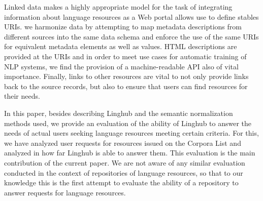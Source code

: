 \documentclass[smallextended]{svjour3}       %
\begin{document}
Linked data makes a highly appropriate model for the task of integrating information
about language resources as a Web portal allows use to define stables URIs.
we harmonize data by attempting to map metadata descriptions from different
sources into the same data schema and enforce the use of the same URIs for
equivalent metadata elements as well as values.
HTML descriptions are provided at the URIs and in order to meet
use cases for automatic training of NLP systems, we find the provision of a
machine-readable API also of vital importance. Finally, links to other resources
are vital to not only provide links back to the source records, but also to ensure
that users can find resources for their needs.

In this paper, besides describing Linghub and the semantic normalization
methods used, we provide an evaluation of the
ability of Linghub to answer the needs of actual users seeking language
resources meeting certain criteria. For this, we have analyzed user requests
for resources issued on the Corpora List and analyzed in how far Linghub is
able to answer them. This evaluation is the main contribution of the current
paper. We are not aware of any similar evaluation conducted in the context of
repositories of language resources, so that to our knowledge this is the first
attempt to evaluate the ability of a repository to answer requests for language
resources.
\end{document}
